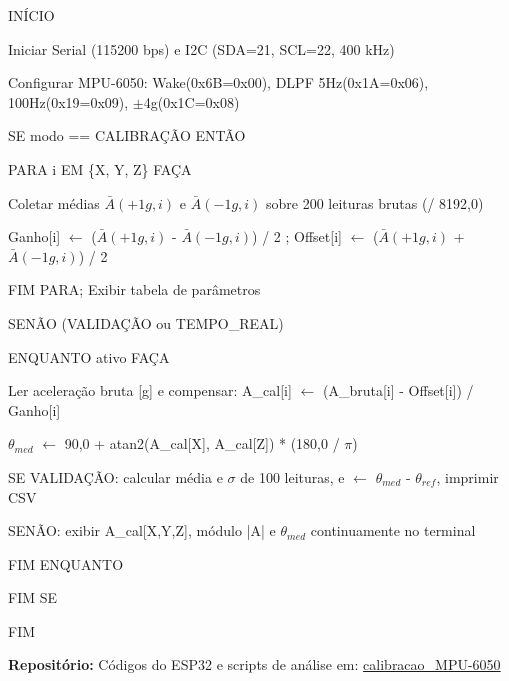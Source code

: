 \begin{algorithm}[H]
\caption{Calibração, Compensação e Estimação Angular no ESP32}
\label{alg:calibracao_esp32}

\small
\ttfamily
\SetAlgoNoLine
\DontPrintSemicolon
\SetAlgoNoEnd

INÍCIO\;

\Indp
Iniciar Serial (115200 bps) e I2C (SDA=21, SCL=22, 400 kHz)\;

Configurar MPU-6050: Wake(0x6B=0x00), DLPF 5Hz(0x1A=0x06), 100Hz(0x19=0x09), $\pm$4g(0x1C=0x08)\;

SE modo == CALIBRAÇÃO ENTÃO\;

\Indp
PARA i EM \{X, Y, Z\} FAÇA\;

\Indp
Coletar médias $\bar{A}(+1g,i)$ e $\bar{A}(-1g,i)$ sobre 200 leituras brutas (/ 8192,0)\;

Ganho[i] $\leftarrow$ ($\bar{A}(+1g,i)$ - $\bar{A}(-1g,i)$) / 2 ; Offset[i] $\leftarrow$ ($\bar{A}(+1g,i)$ + $\bar{A}(-1g,i)$) / 2\;

\Indm
FIM PARA; Exibir tabela de parâmetros\;

\Indm
SENÃO (VALIDAÇÃO ou TEMPO\_REAL)\;

\Indp
ENQUANTO ativo FAÇA\;

\Indp
Ler aceleração bruta [g] e compensar: A_cal[i] $\leftarrow$ (A_bruta[i] - Offset[i]) / Ganho[i]\;

$\theta_{med}$ $\leftarrow$ 90,0 + atan2(A_cal[X], A_cal[Z]) * (180,0 / $\pi$)\;

SE VALIDAÇÃO: calcular média e $\sigma$ de 100 leituras, e $\leftarrow$ $\theta_{med}$ - $\theta_{ref}$, imprimir CSV\;

SENÃO: exibir A_cal[X,Y,Z], módulo |A| e $\theta_{med}$ continuamente no terminal\;

\Indm
FIM ENQUANTO\;

\Indm
FIM SE\;

\Indm
FIM

\end{algorithm}

{\raggedright
\textbf{Repositório:} Códigos do ESP32 e scripts de análise em: \href{https://github.com/mateus-ss/calibracao_MPU-6050}{calibracao\_MPU-6050}}